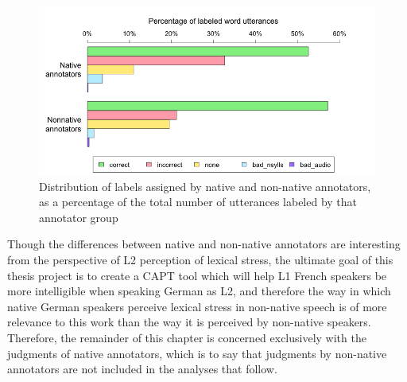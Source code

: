 		
			\begin{figure}[tb]
				\centering
				\includegraphics[width=\textwidth]{img/plots/pctJudgmentsByL1-notStacked}
				\caption[Distribution of labels by annotator L1]{Distribution of labels assigned by native and non-native annotators,
				as a percentage of the total number of utterances labeled by that annotator group %
				}
				\label{fig:agreement:l1bars}
			\end{figure}
			
	
			
		Though the differences between native and non-native annotators are interesting from the perspective of L2 perception of lexical stress, the ultimate goal of this thesis project is to create a CAPT tool which will help L1 French speakers be more intelligible when speaking German as L2, and therefore the way in which native German speakers perceive lexical stress in non-native speech is of more relevance to this work than the way it is perceived by non-native speakers. Therefore, the remainder of this chapter is concerned exclusively with the judgments of native annotators, which is to say that judgments by non-native annotators are not included in the analyses that follow.
			
